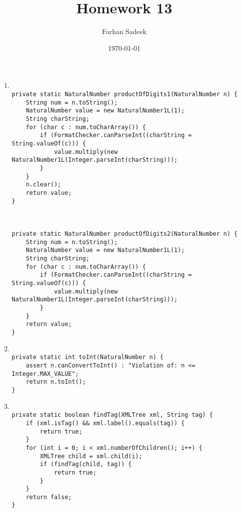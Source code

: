 \documentclass{article}
\begin{document}
\title{Homework 13}
\author{Farhan Sadeek}
\date{\today}
\maketitle

\begin{enumerate}
\item 
\begin{verbatim}

private static NaturalNumber productOfDigits1(NaturalNumber n) {
    String num = n.toString();
    NaturalNumber value = new NaturalNumber1L(1);
    String charString;
    for (char c : num.toCharArray()) {
        if (FormatChecker.canParseInt((charString = String.valueOf(c))) {
            value.multiply(new NaturalNumber1L(Integer.parseInt(charString)));
        }
    }
    n.clear();
    return value;
}



private static NaturalNumber productOfDigits2(NaturalNumber n) {
    String num = n.toString();
    NaturalNumber value = new NaturalNumber1L(1);
    String charString;
    for (char c : num.toCharArray()) {
        if (FormatChecker.canParseInt((charString = String.valueOf(c))) {
            value.multiply(new NaturalNumber1L(Integer.parseInt(charString)));
        }
    }
    return value;
}

\end{verbatim}

\item 
\begin{verbatim}

private static int toInt(NaturalNumber n) {
    assert n.canConvertToInt() : "Violation of: n <= Integer.MAX_VALUE";
    return n.toInt();
}

\end{verbatim}

\item 
\begin{verbatim}

private static boolean findTag(XMLTree xml, String tag) {
    if (xml.isTag() && xml.label().equals(tag)) {
        return true;
    }
    for (int i = 0; i < xml.numberOfChildren(); i++) {
        XMLTree child = xml.child(i);
        if (findTag(child, tag)) {
            return true;
        }
    }
    return false;
}

\end{verbatim}




\end{enumerate}
\end{document}
